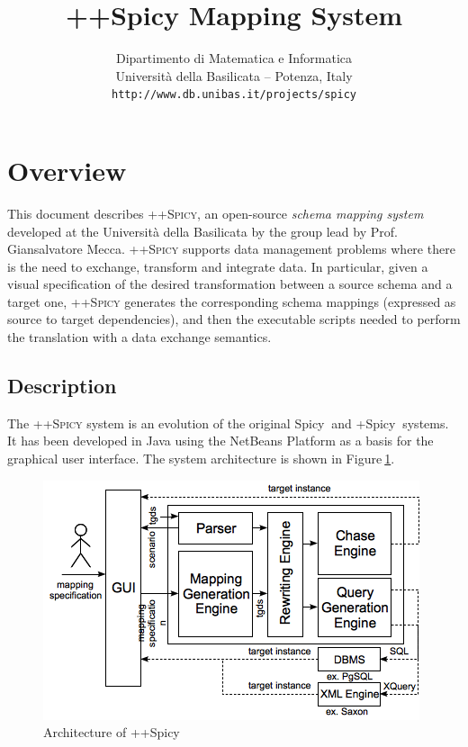 \documentclass[12pt]{article}
\newcommand{\spicypp}{\textsc{++Spicy}}
\newcommand{\aacc}{\`a}
\newcommand{\tld}{$~$}
\newcommand{\removespace}{\vspace*{-0.35cm}}
\newcommand{\removelargespace}{\vspace*{-0.7cm}}
\begin{document}

\title{++Spicy Mapping System}

\author{
Dipartimento di Matematica e Informatica\\
Universit{\aacc} della Basilicata -- Potenza, Italy\\
{\tt http://www.db.unibas.it/projects/spicy}
}

\maketitle

\tableofcontents
\setcounter{tocdepth}{3}

\section{Overview} \label{sec:overview}
This document describes {\spicypp}, an open-source {\em schema mapping system} developed at the Universit{\aacc} della Basilicata by the group lead by Prof. Giansalvatore Mecca. {\spicypp} supports data management problems where there is the need to exchange, transform and integrate data. In particular, given a visual specification of  the desired transformation between a source schema and a target one, {\spicypp} generates the corresponding schema mappings (expressed as source to target dependencies), and then the executable scripts needed to perform the translation with a data exchange semantics.

\subsection{Description}

The {\spicypp} system is an evolution of the original Spicy\tld\cite{Bonifati2008,Bonifati08b} and +Spicy\tld\cite{Mecca2009b} systems. It has been developed in Java using the NetBeans Platform as a basis for the graphical user interface. The system architecture is shown in Figure\tld\ref{fig:architecture}. 

\begin{figure}[htb]
\removespace
\begin{center}
\includegraphics[width=0.8\columnwidth]{images/architecture.png}
\removespace
\caption{\small Architecture of ++Spicy} \label{fig:architecture}
\end{center}
\removelargespace
\end{figure}
\end{document}
